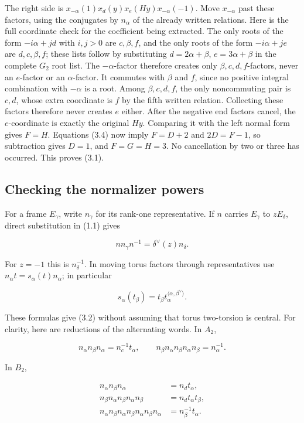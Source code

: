 \documentclass[11pt,a4paper,openany]{report}
\begin{document}
The right side is \(x_{-\alpha}(1)x_d(y)x_e(Hy)x_{-\alpha}(-1)\). Move \(x_{-\alpha}\) past these factors, using the conjugates by \(n_\alpha\) of the already written relations. Here is the full coordinate check for the coefficient being extracted. The only roots of the form \(-i\alpha+jd\) with \(i,j>0\) are \(c,\beta,f\), and the only roots of the form \(-i\alpha+je\) are \(d,c,\beta,f\); these lists follow by substituting \(d=2\alpha+\beta\), \(e=3\alpha+\beta\) in the complete \(G_2\) root list. The \(-\alpha\)-factor therefore creates only \(\beta,c,d,f\)-factors, never an \(e\)-factor or an \(\alpha\)-factor. It commutes with \(\beta\) and \(f\), since no positive integral combination with \(-\alpha\) is a root. Among \(\beta,c,d,f\), the only noncommuting pair is \(c,d\), whose extra coordinate is \(f\) by the fifth written relation. Collecting these factors therefore never creates \(e\) either. After the negative end factors cancel, the \(e\)-coordinate is exactly the original \(Hy\). Comparing it with the left normal form gives \(F=H\). Equations (3.4) now imply \(F=D+2\) and \(2D=F-1\), so subtraction gives \(D=1\), and \(F=G=H=3\). No cancellation by two or three has occurred. This proves (3.1).

\subsection{Checking the normalizer powers}\label{AG-RG-05-checking-the-normalizer-powers}

For a frame \(E_\gamma\), write \(n_\gamma\) for its rank-one representative. If \(n\) carries \(E_\gamma\) to \(zE_\delta\), direct substitution in (1.1) gives

\[
n n_\gamma n^{-1}=\delta^\vee(z)n_\delta.
\tag{3.5}
\]

For \(z=-1\) this is \(n_\delta^{-1}\). In moving torus factors through representatives use \(n_\alpha t=s_\alpha(t)n_\alpha\); in particular

\[
s_\alpha(t_\beta)
=t_\beta t_\alpha^{\langle\alpha,\beta^\vee\rangle}.
\tag{3.6}
\]

These formulas give (3.2) without assuming that torus two-torsion is central. For clarity, here are reductions of the alternating words. In \(A_2\),

\[
n_\alpha n_\beta n_\alpha=n_c^{-1}t_\alpha,\qquad
n_\beta n_\alpha n_\beta n_\alpha n_\beta=n_\alpha^{-1}.
\]

In \(B_2\),

\[
\begin{aligned}
n_\alpha n_\beta n_\alpha&=n_dt_\alpha,\\
n_\beta n_\alpha n_\beta n_\alpha n_\beta&=n_dt_\alpha t_\beta,\\
n_\alpha n_\beta n_\alpha n_\beta n_\alpha n_\beta n_\alpha&=n_\beta^{-1}t_\alpha.
\end{aligned}
\]
\end{document}
